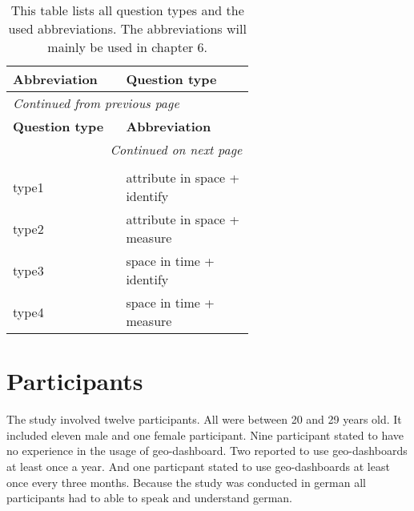 \begin{longtable}{| p{0.20\linewidth} | p{0.40\linewidth}|}
    \hline
    \textbf{Abbreviation} & \textbf{Question type} \\
    \hline
    \endfirsthead
    \multicolumn{2}{l}{{\textit{Continued from previous page}}} \\
    \hline
    \textbf{Question type} & \textbf{Abbreviation} \\
    \hline
    \endhead
    \hline \multicolumn{2}{r}{{\textit{Continued on next page}}} \\
    \endfoot
    \hline
    \caption{This table lists all question types and the used abbreviations. The abbreviations will mainly be used in chapter 6. \label{questionTypesTable}}\\
    \endlastfoot
    type1 & attribute in space + identify \\
    \hline
    type2 & attribute in space + measure \\
    \hline
    type3 & space in time + identify \\
    \hline
    type4 & space in time + measure\\
\end{longtable}

\section{Participants}
The study involved twelve participants. All were between 20 and 29 years old. It included eleven male and one female participant. Nine
participant stated to have no experience in the usage of geo-dashboard. Two reported to use geo-dashboards at least once a year. And one particpant
stated to use geo-dashboards at least once every three months. Because the study was conducted in german all participants had to able to speak
and understand german.

